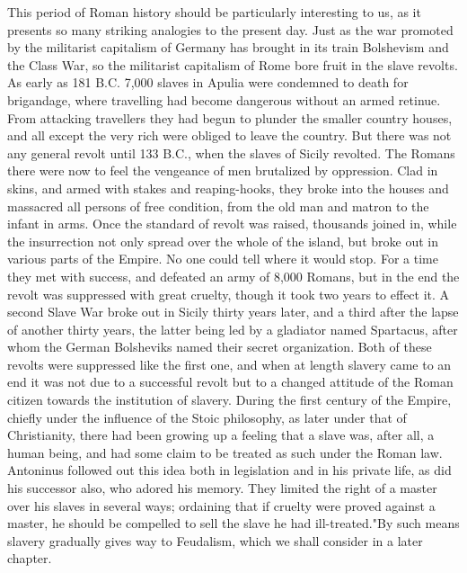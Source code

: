 \documentclass{book}
\begin{document}
This period of Roman history should be particularly interesting to us, as it presents so many striking analogies to the present day. Just as the war promoted by the militarist capitalism of Germany has brought in its train Bolshevism and the Class War, so the militarist capitalism of Rome bore fruit in the slave revolts. As early as 181 B.C. 7,000 slaves in Apulia were condemned to death for brigandage, where travelling had become dangerous without an armed retinue. From attacking travellers they had begun to plunder the smaller country houses, and all except the very rich were obliged to leave the country. But there was not any general revolt until 133 B.C., when the slaves of Sicily revolted. The Romans there were now to feel the vengeance of men brutalized by oppression. Clad in skins, and armed with stakes and reaping-hooks, they broke into the houses and massacred all persons of free condition, from the old man and matron to the infant in arms. Once the standard of revolt was raised, thousands joined in, while the insurrection not only spread over the whole of the island, but broke out in various parts of the Empire. No one could tell where it would stop. For a time they met with success, and defeated an army of 8,000 Romans, but in the end the revolt was suppressed with great cruelty, though it took two years to effect it. A second Slave War broke out in Sicily thirty years later, and a third after the lapse of another thirty years, the latter being led by a gladiator named Spartacus, after whom the German Bolsheviks named their secret organization. Both of these revolts were suppressed like the first one, and when at length slavery came to an end it was not due to a successful revolt but to a changed attitude of the Roman citizen towards the institution of slavery. During the first century of the Empire, chiefly under the influence of the Stoic philosophy, as later under that of Christianity, there had been growing up a feeling that a slave was, after all, a human being, and had some claim to be treated as such under the Roman law. Antoninus followed out this idea both in legislation and in his private life, as did his successor also, who adored his memory. They limited the right of a master over his slaves in several ways; ordaining that if cruelty were proved against a master, he should be compelled to sell the slave he had ill-treated."\footnotemark[6] By such means slavery gradually gives way to Feudalism, which we shall consider in a later chapter.
\end{document}
